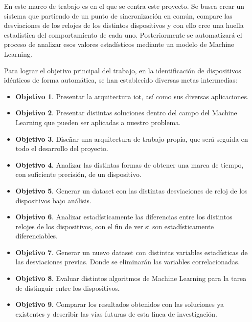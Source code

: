 En este marco de trabajo es en el que se centra este proyecto. Se busca crear un sistema que partiendo de un punto de sincronización en común, compare las desviaciones de los relojes de los distintos dispositivos y con ello cree una huella estadística del comportamiento de cada uno. Posteriormente se automatizará el proceso de analizar esos valores estadísticos mediante un modelo de Machine Learning.

Para lograr el objetivo principal del trabajo, en la identificación de dispositivos idénticos de forma automática, se han establecido diversas metas intermedias:

\begin{itemize}
    \item \textbf{Objetivo 1}. Presentar la arquitectura \acrshort{iot}, así como sus diversas aplicaciones.
    \item \textbf{Objetivo 2}. Presentar distintas soluciones dentro del campo del Machine Learning que pueden ser aplicadas a nuestro problema.
    \item \textbf{Objetivo 3}. Diseñar una arquitectura de trabajo propia, que será seguida en todo el desarrollo del proyecto.
    \item \textbf{Objetivo 4}. Analizar las distintas formas de obtener una marca de tiempo, con suficiente precisión, de un dispositivo.
    \item \textbf{Objetivo 5}. Generar un dataset con las distintas desviaciones de reloj de los dispositivos bajo análisis.
    \item \textbf{Objetivo 6}. Analizar estadísticamente las diferencias entre los distintos relojes de los dispositivos, con el fin de ver si son estadísticamente diferenciables.
    \item \textbf{Objetivo 7}. Generar un nuevo dataset con distintas variables estadísticas de las desviaciones previas. Donde se eliminarán las variables correlacionadas.
    \item \textbf{Objetivo 8}. Evaluar distintos algoritmos de Machine Learning para la tarea de distinguir entre los dispositivos.
    \item \textbf{Objetivo 9}. Comparar los resultados obtenidos con las soluciones ya existentes y describir las vías futuras de esta línea de investigación.
\end{itemize}

